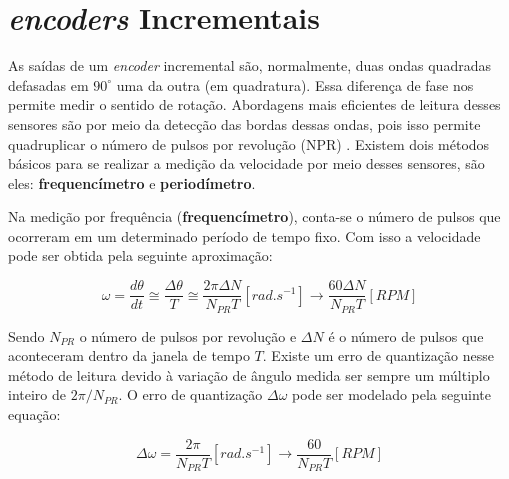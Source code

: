 \section{\textit{encoders} Incrementais}
\label{sec:encoders}


As saídas de um \emph{encoder} incremental são, normalmente, duas ondas quadradas defasadas em $90^\circ$ uma da outra (em quadratura). Essa diferença de fase nos permite medir o sentido de rotação. Abordagens mais eficientes de leitura desses sensores são por meio da detecção das bordas dessas ondas, pois isso permite quadruplicar o número de pulsos por revolução (NPR) \cite{quantization_error01}. Existem dois métodos básicos para se realizar a medição da velocidade por meio desses sensores, são eles: \textbf{frequencímetro} e \textbf{periodímetro}. 

Na medição por frequência (\textbf{frequencímetro}), conta-se o número de pulsos que ocorreram em um determinado período de tempo fixo. Com isso a velocidade pode ser obtida pela seguinte aproximação:

\begin{equation}
    \omega = \frac{d\theta}{dt} \cong \frac{\Delta{\theta}}{T} \cong \frac{2 \pi \Delta{N}}{N_{PR}T}[rad.s^{-1}] \xrightarrow{} \frac{60 \Delta{N}}{N_{PR} T} [RPM]
\end{equation}

Sendo $N_{PR}$ o número de pulsos por revolução e $\Delta{N}$ é o número de pulsos que aconteceram dentro da janela de tempo $T$. Existe um erro de quantização nesse método de leitura devido à variação de ângulo medida ser sempre um múltiplo inteiro de $ 2\pi/N_{PR}$. O erro de quantização $\Delta{\omega}$ pode ser modelado pela seguinte equação:

\begin{equation}
    \Delta{\omega} = \frac{2\pi}{N_{PR}T}[rad.s^{-1}] \xrightarrow{} \frac{60}{N_{PR}T}[RPM]
    \label{eq:erro_de_quantizacao_frequencimetro}
\end{equation}

